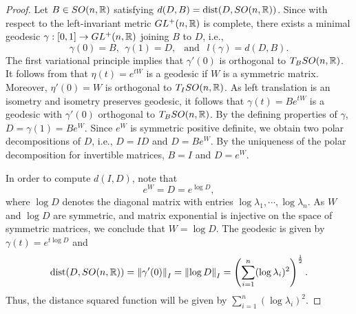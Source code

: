 \begin{proof}
    Let $B\in SO(n,\mathbb{R})$ satisfying $d(D,B) = \operatorname{dist}(D,SO(n,\mathbb{R}))$. Since with respect to the left-invariant metric $GL^+(n,\mathbb{R})$ is complete, there exists a minimal geodesic $\gamma:[0,1]\to GL^+(n,\mathbb{R})$ joining $B$ to $D$, i.e., 
    \begin{displaymath}
        \gamma(0) = B,~~\gamma(1) = D, ~~\text{ and } ~~ l(\gamma) = d(D,B).
    \end{displaymath}
    The first variational principle implies that $\gamma'(0)$ is orthogonal to $T_BSO(n,\mathbb{R})$. It follows from \cite[\S 2.1]{MaNe16} that $\eta(t)=e^{tW}$ is a geodesic if $W$ is a symmetric matrix. Moreover, $\eta'(0)=W$ is orthogonal to $T_I SO(n,\mathbb{R})$. As left translation is an isometry and isometry preserves geodesic, it follows that $\gamma(t) = Be^{tW}$ is a geodesic with $\gamma'(0)$ orthogonal to $T_BSO(n,\mathbb{R})$. By the defining properties of $\gamma$,  $D=\gamma(1)=Be^W$. Since $e^W$ is symmetric positive definite, we obtain two polar decompositions  of $D$, i.e., $D = ID$ and $ D = Be^W$. By the uniqueness of the polar decomposition for invertible matrices, $B=I$ and $D=e^W$. 

    \vspace{0.2cm}
    \hf In order to compute $d(I,D)$, note that 
    \begin{displaymath}
        e^W = D = e^{\log D},
    \end{displaymath}
    where $\log D$ denotes the diagonal matrix with entries $\log \lambda_1,\cdots,\log \lambda_n$. As $W$ and $\log D$ are symmetric, and matrix exponential is injective on the space of symmetric matrices, we conclude that $W = \log D$. The geodesic is given by $\gamma(t)=e^{t\log D}$ and 
    \begin{equation}\label{eq: distance left invariant}
        \operatorname{dist}(D,SO(n,\mathbb{R})) = \left\|\gamma'(0)\right\|_I = \left\|\log D\right\|_I = \left(\sum_{i=1}^n (\log \lambda_i)^2\right)^{\frac{1}{2}}.
    \end{equation}
    Thus, the distance squared function will be given by $\sum_{i=1}^n (\log \lambda_i)^2$. 
\end{proof}

